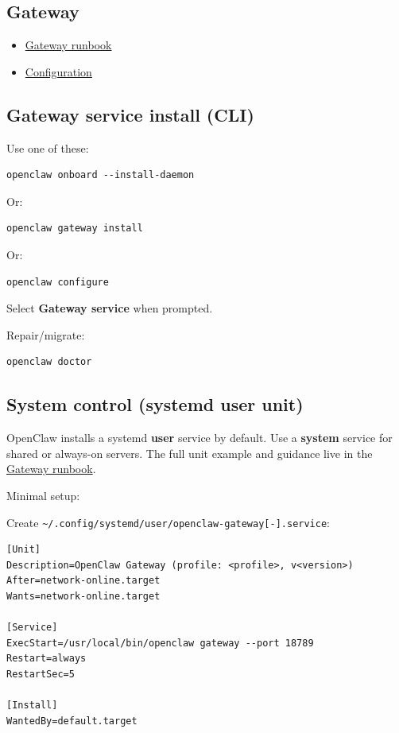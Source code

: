 \subsection{Gateway}


\begin{itemize}
  \item \href{/gateway}{Gateway runbook}
  \item \href{/gateway/configuration}{Configuration}
\end{itemize}


\subsection{Gateway service install (CLI)}


Use one of these:

\begin{lstlisting}
openclaw onboard --install-daemon
\end{lstlisting}


Or:

\begin{lstlisting}
openclaw gateway install
\end{lstlisting}


Or:

\begin{lstlisting}
openclaw configure
\end{lstlisting}


Select \textbf{Gateway service} when prompted.

Repair/migrate:

\begin{lstlisting}
openclaw doctor
\end{lstlisting}


\subsection{System control (systemd user unit)}


OpenClaw installs a systemd \textbf{user} service by default. Use a \textbf{system}
service for shared or always-on servers. The full unit example and guidance
live in the \href{/gateway}{Gateway runbook}.

Minimal setup:

Create \texttt{\textasciitilde{}/.config/systemd/user/openclaw-gateway[-].service}:

\begin{lstlisting}
[Unit]
Description=OpenClaw Gateway (profile: <profile>, v<version>)
After=network-online.target
Wants=network-online.target

[Service]
ExecStart=/usr/local/bin/openclaw gateway --port 18789
Restart=always
RestartSec=5

[Install]
WantedBy=default.target
\end{lstlisting}


